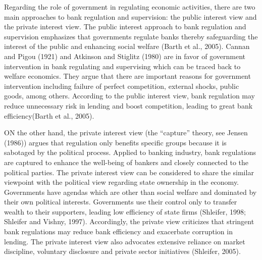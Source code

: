 \documentclass[
  12pt,
  a4paper,
]{scrreprt}
\begin{document}
{{{{Regarding the role of government in regulating economic activities,
there are two main approaches to bank regulation and supervision: the
public interest view and the private interest view. The public interest
approach to bank regulation and supervision emphasizes that governments
regulate banks thereby safeguarding the interest of the public and
enhancing social welfare (Barth et al., 2005). Cannan and Pigou (1921)
and Atkinson and Stiglitz (1980) are in favor of government intervention
in bank regulating and supervising which can be traced back to welfare
economics. They argue that there are important reasons for government
intervention including failure of perfect competition, external shocks,
public goods, among others. According to the public interest view, bank
regulation may reduce unnecessary risk in lending and boost competition,
leading to great bank efficiency(Barth et al., 2005).

ON the other hand, the private interest view (the ``capture'' theory,
see Jensen (1986)) argues that regulation only benefits specific groups
because it is sabotaged by the political process. Applied to banking
industry, bank regulations are captured to enhance the well-being of
bankers and closely connected to the political parties. The private
interest view can be considered to share the similar viewpoint with the
political view regarding state ownership in the economy. Governments
have agendas which are other than social welfare and dominated by their
own political interests. Governments use their control only to transfer
wealth to their supporters, leading low efficiency of state firms
(Shleifer, 1998; Shleifer and Vishny, 1997). Accordingly, the private
view criticizes that stringent bank regulations may reduce bank
efficiency and exacerbate corruption in lending. The private interest
view also advocates extensive reliance on market discipline, voluntary
disclosure and private sector initiatives (Shleifer, 2005).

}}}}
\end{document}
